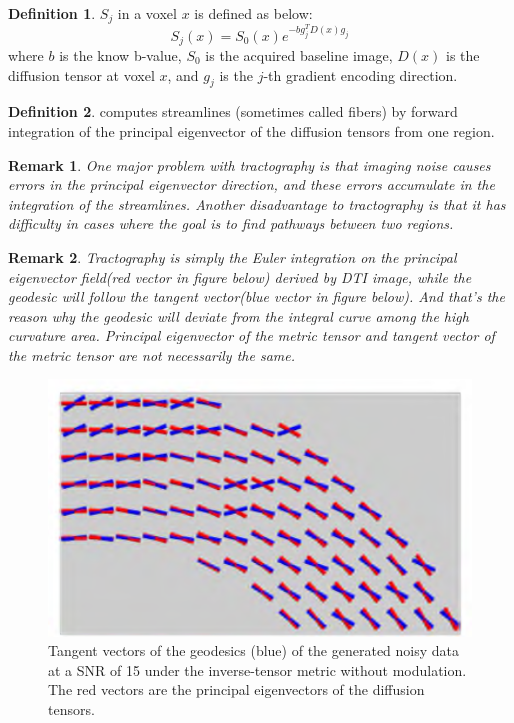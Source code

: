 \documentclass[a4paper]{article}
\theoremstyle{definition}
\newtheorem{definition}{Definition}
\theoremstyle{plain}
\newtheorem{remark}{Remark}
\begin{document}
\begin{definition}
 $S_j$ in a voxel $x$ is defined as below:
\begin{equation*}
    S_j(x)=S_0(x)e^{-bg^T_jD(x)g_j}
\end{equation*}
where $b$ is the know b-value, $S_0$ is the acquired baseline image, $D(x)$ is the diffusion tensor at voxel $x$, and $g_j$ is the $j$-th gradient encoding direction.
\end{definition}

\begin{definition}
 computes streamlines (sometimes called fibers) by forward integration of the principal eigenvector of the diffusion tensors from one region.
\end{definition}

\begin{remark}
One major problem with tractography is that imaging noise causes errors in the principal eigenvector direction, and these errors accumulate in the integration of the streamlines. Another disadvantage to tractography is that it has difficulty in cases where the goal is to find pathways between two regions.
\end{remark}

\begin{remark}
Tractography is simply the Euler integration on the principal eigenvector field(red vector in figure below) derived by DTI image, while the geodesic will follow the tangent vector(blue vector in figure below). And that's the reason why the geodesic will deviate from the integral curve among the high curvature area. Principal eigenvector of the metric tensor and tangent vector of the metric tensor are not necessarily the same.
\end{remark}

\begin{figure}[H]
    \centering
    \includegraphics[scale=0.5]{figure/teneigen.png}
    \caption{Tangent vectors of the geodesics (blue) of the generated noisy data at a SNR of 15 under the inverse-tensor metric without modulation. The red vectors are the principal eigenvectors of the diffusion tensors.}
\end{figure}
\end{document}

